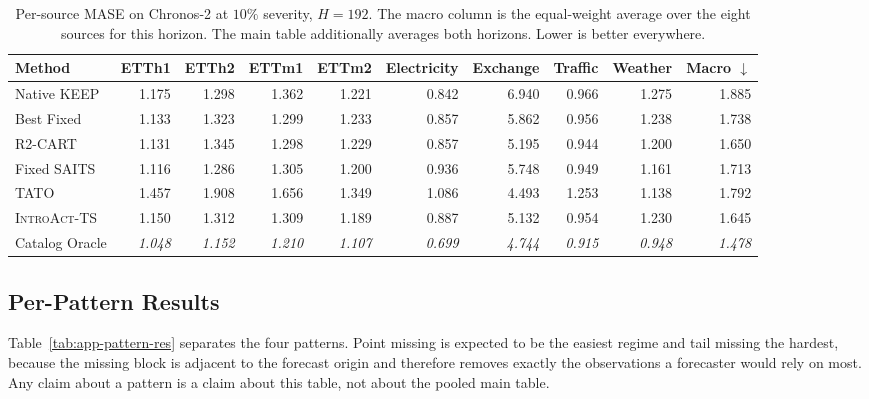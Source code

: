\documentclass{article}
\newcommand{\oracle}[1]{\textit{\textcolor{phgray}{#1}}}
\newcommand{\introact}{\textsc{IntroAct-TS}}
\begin{document}
\begin{table}[htbp]
  \caption{Per-source MASE on Chronos-2 at $10\%$ severity, $H=192$. The macro column is the
  equal-weight average over the eight sources for this horizon. The main table additionally averages both horizons. Lower is better everywhere.}
  \label{tab:app-src-ch2-192}
  \centering
  \small
  \setlength{\tabcolsep}{3pt}
\begin{tabular*}{\textwidth}{@{\extracolsep{\fill}}lrrrrrrrrr@{}}
    \toprule
    Method & ETTh1 & ETTh2 & ETTm1 & ETTm2 & Electricity & Exchange & Traffic & Weather & Macro $\downarrow$ \\
    \midrule
    Native KEEP & 1.175 & 1.298 & 1.362 & 1.221 & 0.842 & 6.940 & 0.966 & 1.275 & 1.885 \\
    Best Fixed & 1.133 & 1.323 & 1.299 & 1.233 & 0.857 & 5.862 & 0.956 & 1.238 & 1.738 \\
    R2-CART & 1.131 & 1.345 & 1.298 & 1.229 & 0.857 & 5.195 & 0.944 & 1.200 & 1.650 \\
    Fixed SAITS & 1.116 & 1.286 & 1.305 & 1.200 & 0.936 & 5.748 & 0.949 & 1.161 & 1.713 \\
    TATO & 1.457 & 1.908 & 1.656 & 1.349 & 1.086 & 4.493 & 1.253 & 1.138 & 1.792 \\
    \midrule
    \rowcolor{bestgray}\introact{} & 1.150 & 1.312 & 1.309 & 1.189 & 0.887 & 5.132 & 0.954 & 1.230 & 1.645 \\
    \midrule
    Catalog Oracle & \oracle{1.048} & \oracle{1.152} & \oracle{1.210} & \oracle{1.107} & \oracle{0.699} & \oracle{4.744} & \oracle{0.915} & \oracle{0.948} & \oracle{1.478} \\
    \bottomrule
  \end{tabular*}
\end{table}

\subsection{Per-Pattern Results}
\label{app:pattern}
Table~\ref{tab:app-pattern-res} separates the four patterns. Point missing is expected to
be the easiest regime and tail missing the hardest, because the missing block is adjacent
to the forecast origin and therefore removes exactly the observations a forecaster would
rely on most. Any claim about a pattern is a claim about this table, not about the pooled
main table.
\end{document}
